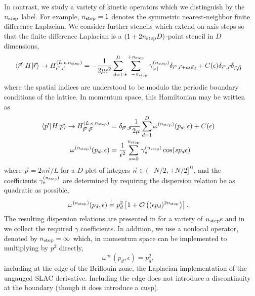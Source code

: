 In contrast, we study a variety of kinetic operators which we distinguish by the ${n_\text{step}}$ label.
For example, ${n_\text{step}}=1$ denotes the symmetric nearest-neighbor finite difference Laplacian.
We consider further stencils which extend on-axis steps so that the finite difference Laplacian is a $(1+2{n_\text{step}} D)$-point stencil in $D$ dimensions,
\begin{equation}
    \left\langle \vec{r}' \middle| H \middle| \vec{r} \right\rangle
    \rightarrow
    H_{\vec{r}',\vec{r}}^{(L,\epsilon,{n_\text{step}})}
    =
    - \frac{1}{2 \mu \epsilon^2}
        \sum_{d=1}^{D} \sum_{s=-{n_\text{step}}}^{+{n_\text{step}}}
            \gamma^{({n_\text{step}})}_{|s|} \delta_{\vec{r}',\vec{r}+\epsilon s \vec{e}_d}
    + C(\epsilon) \delta_{\vec{r}',\vec{r}}\delta_{\vec{r},\vec{0}}
\end{equation}
where the spatial indices are understood to be modulo the periodic boundary conditions of the lattice.
In momentum space, this Hamiltonian may be written as
\begin{align}
    \label{eq:p space hamiltonian}
    \left\langle \vec{p}' \middle| H \middle| \vec{p} \right\rangle
    \rightarrow
    H_{\vec{p}',\vec{p}}^{(L,\epsilon,{n_\text{step}})}
    &= \delta_{\vec{p}',\vec{p}} \frac{1}{2\mu} \sum_{d=1}^{D} \omega^{({n_\text{step}})}(p_d,\epsilon) + C(\epsilon)
    \\
    \label{eq:gamma definition}
    \omega^{({n_\text{step}})}(p_d,\epsilon)
    &= \frac{1}{\epsilon^2} \sum_{s=0}^{{n_\text{step}}} \gamma_{s}^{({n_\text{step}})} \cos(s p_d \epsilon)
\end{align}
where $\vec{p} = 2\pi \vec{n}/L$ for a $D$-plet of integers $\vec{n} \in (-N/2, +N/2]^D$, and the coefficients $\gamma_{s}^{({n_\text{step}})}$ are determined by requiring the dispersion relation be as quadratic as possible,
\begin{equation}
    \label{eq:gamma determination}
    \omega^{({n_\text{step}})}(p_d,\epsilon) \overset{!}{=} p_d^2 \left[ 1 + \mathcal{O}\left((\epsilon p_d)^{2{n_\text{step}}}\right)\right].
\end{equation}
The resulting dispersion relations are presented in  for a variety of ${n_\text{step}}$s and
in  we collect the required $\gamma$ coefficients.
In addition, we use a nonlocal operator, denoted by ${n_\text{step}}=\infty$ which, in momentum space can be implemented to multiplying by $p^2$ directly,
\begin{equation}
    \omega^{\infty}(p_d,\epsilon) = p_d^2,
\end{equation}
including at the edge of the Brillouin zone, the Laplacian implementation of the ungauged SLAC derivative.
Including the edge does not introduce a discontinuity at the boundary (though it does introduce a cusp).

